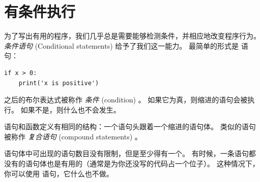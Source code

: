 {{{{%
\section{有条件执行}
\label{conditional.execution}

  
  


为了写出有用的程序，我们几乎总是需要能够检测条件，并相应地改变程序行为。
{\em 条件语句} (Conditional statements) 给予了我们这一能力。
最简单的形式是  语句：

\begin{lstlisting}
if x > 0:
    print('x is positive')
\end{lstlisting}

%

 之后的布尔表达式被称作 {\em 条件} (condition) 。
如果它为真，则缩进的语句会被执行。 如果不是，则什么也不会发生。
  


 语句和函数定义有相同的结构：一个语句头跟着一个缩进的语句体。
类似的语句被称作 {\em 复合语句} (compound statements) 。


语句体中可出现的语句数目没有限制，但是至少得有一个。
有时候，一条语句都没有的语句体也是有用的（通常是为你还没写的代码占一个位子）。
这种情况下，你可以使用  语句，它什么也不做。
  


}}}}
